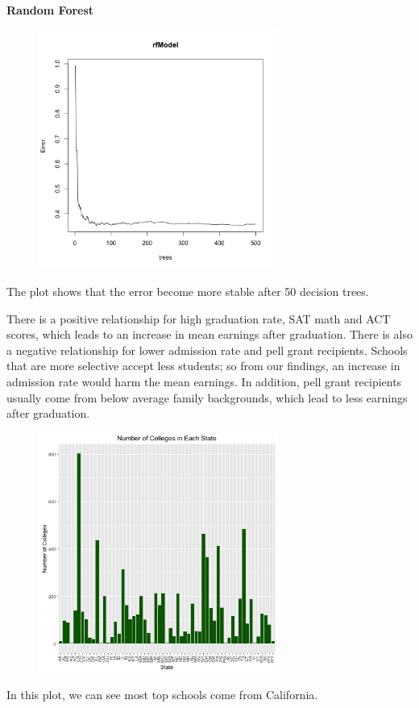 \documentclass{article}
\begin{document}
\textbf{Random Forest}\newline

\begin{figure}[H]
\includegraphics[width=0.7\textwidth]{../images/rf_top.png}
\end{figure}
The plot shows that the error become more stable after 50 decision trees.



There is a positive relationship for high graduation rate, SAT math and ACT scores, which leads to an increase in mean earnings after graduation.  There is also a negative relationship for lower admission rate and pell grant recipients.  Schools that are more selective accept less students; so from our findings, an increase in admission rate would harm the mean earnings.  In addition, pell grant recipients usually come from below average family backgrounds, which lead to less earnings after graduation. 


\begin{figure}[H]
\includegraphics[width=0.7\textwidth]{../images/college-frequency.png}
\end{figure}
In this plot, we can see most top schools come from California. 
\end{document}
